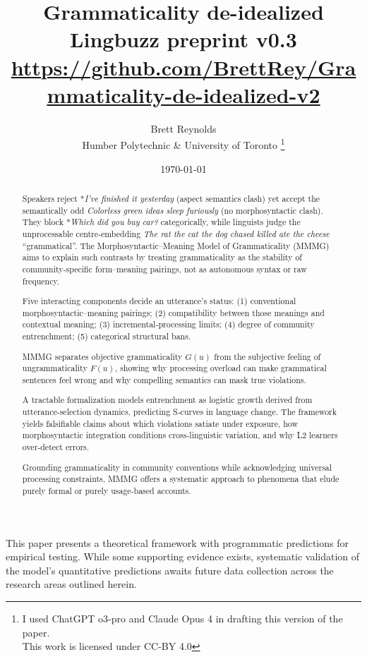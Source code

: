 \documentclass[12pt]{article}
\title{Grammaticality de-idealized\\[4pt]
       \large Lingbuzz preprint v0.3\\[6pt]
       \normalsize \url{https://github.com/BrettRey/Grammaticality-de-idealized-v2}}
\author{Brett Reynolds \orcidlink{0000-0003-0073-7195}\\Humber Polytechnic \& University of Toronto
\thanks{I used ChatGPT o3-pro and Claude Opus 4 in drafting this version of the paper.\\This work is licensed under CC-BY 4.0}}
\date{\today}
\begin{document}
\maketitle

\begin{abstract}
\small
Speakers reject *\textit{I've finished it yesterday} (aspect semantics clash) yet accept the semantically odd \textit{Colorless green ideas sleep furiously} (no morphosyntactic clash). They block *\textit{Which did you buy car?} categorically, while linguists judge the unprocessable centre‑embedding \textit{The rat the cat the dog chased killed ate the cheese} \enquote{grammatical}.  
The Morphosyntactic–Meaning Model of Grammaticality (MMMG) aims to explain such contrasts by treating grammaticality as the stability of community‑specific form–meaning pairings, not as autonomous syntax or raw frequency.

Five interacting components decide an utterance's status:  
(1) conventional morphosyntactic--meaning pairings;  
(2) compatibility between those meanings and contextual meaning;  
(3) incremental‑processing limits;  
(4) degree of community entrenchment;  
(5) categorical structural bans.

MMMG separates objective grammaticality \(G(u)\) from the subjective feeling of ungrammaticality \(F(u)\), showing why processing overload can make grammatical sentences feel wrong and why compelling semantics can mask true violations.  

A tractable formalization models entrenchment as logistic growth derived from utterance-selection dynamics, predicting S‑curves in language change. The framework yields falsifiable claims about which violations satiate under exposure, how morphosyntactic integration conditions cross‑linguistic variation, and why L2 learners over‑detect errors.  

Grounding grammaticality in community conventions while acknowledging universal processing constraints, MMMG offers a systematic approach to phenomena that elude purely formal or purely usage‑based accounts.
\end{abstract}

\begin{tcolorbox}[colback=lsLightBlue!20,title=Research Programme]
This paper presents a theoretical framework with programmatic predictions for empirical testing. While some supporting evidence exists, systematic validation of the model's quantitative predictions awaits future data collection across the research areas outlined herein.
\end{tcolorbox}
\end{document}

